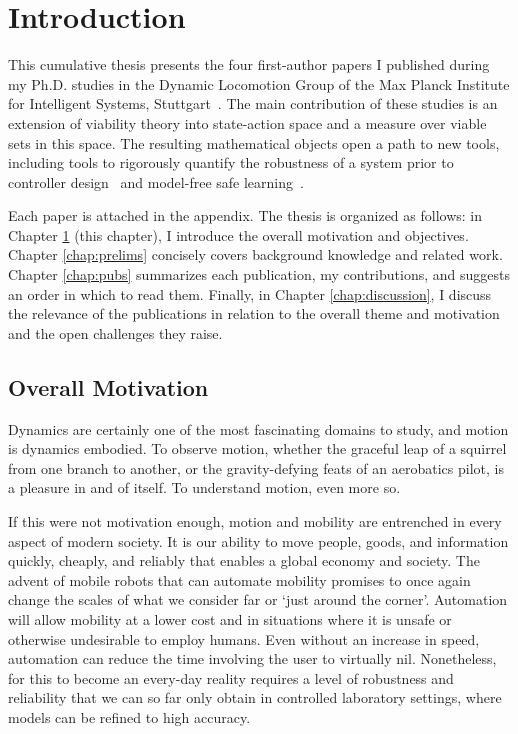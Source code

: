 
\chapter{Introduction} \label{chap:intro}
This cumulative thesis presents the four first-author papers I published during my Ph.D. studies in the Dynamic Locomotion Group of the Max Planck Institute for Intelligent Systems, Stuttgart~\cite{heim2018shaping,heim2019beyond,heim2019learnable,heim2018unviable}. The main contribution of these studies is an extension of viability theory into state-action space and a measure over viable sets in this space.
The resulting mathematical objects open a path to new tools, including tools to rigorously quantify the robustness of a system prior to controller design~\cite{heim2019beyond} and model-free safe learning~\cite{heim2019learnable}. \par
Each paper is attached in the appendix.
The thesis is organized as follows: in Chapter \ref{chap:intro} (this chapter), I introduce the overall motivation and objectives.
Chapter \ref{chap:prelims} concisely covers background knowledge and related work.
Chapter \ref{chap:pubs} summarizes each publication, my contributions, and suggests an order in which to read them.
Finally, in Chapter \ref{chap:discussion}, I discuss the relevance of the publications in relation to the overall theme and motivation and the open challenges they raise.

\section{Overall Motivation}

Dynamics are certainly one of the most fascinating domains to study, and motion is dynamics embodied. To observe motion, whether the graceful leap of a squirrel from one branch to another, or the gravity-defying feats of an aerobatics pilot, is a pleasure in and of itself. To understand motion, even more so. \par

If this were not motivation enough, motion and mobility are entrenched in every aspect of modern society. It is our ability to move people, goods, and information quickly, cheaply, and reliably that enables a global economy and society. The advent of mobile robots that can automate mobility promises to once again change the scales of what we consider far or `just around the corner'. Automation will allow mobility at a lower cost and in situations where it is unsafe or otherwise undesirable to employ humans. Even without an increase in speed, automation can reduce the time involving the user to virtually nil. Nonetheless, for this to become an every-day reality requires a level of robustness and reliability that we can so far only obtain in controlled laboratory settings, where models can be refined to high accuracy. \par

